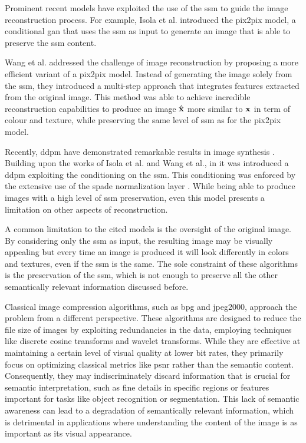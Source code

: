 Prominent recent models have exploited the use of the  \gls{ssm} to guide the image reconstruction process. For example, Isola et al. \cite{isola2017image2image} introduced the pix2pix model, a conditional \gls{gan} that uses the \gls{ssm} as input to generate an image that is able to preserve the \gls{ssm} content.

Wang et al. \cite{Wang2018HighRes} addressed the challenge of image reconstruction by proposing a more efficient variant of a pix2pix model. Instead of generating the image solely from the \gls{ssm}, they introduced a multi-step approach that integrates features extracted from the original image. This method was able to achieve incredible reconstruction capabilities to produce an image $\hat{\mathbf{x}}$ more similar to $\mathbf{x}$ in term of colour and texture, while preserving the same level of \gls{ssm} as for the pix2pix model.

Recently, \gls{ddpm} \cite{Ho2020ddpm} have demonstrated remarkable results in image synthesis \cite{Dhariwal2021DDPM_beat_GAN, Nichol2021Improved_DDPM}. Building upon the works of Isola et al. and Wang et al., in \cite{Wang2022SISDM} it was introduced a \gls{ddpm} exploiting the conditioning on the \gls{ssm}. This conditioning was enforced by the extensive use of the \gls{spade} normalization layer \cite{Park2019SPADE}. While being able to produce images with a high level of \gls{ssm} preservation, even this model presents a limitation on other aspects of reconstruction.

A common limitation to the cited models is the oversight of the original image. By considering only the \gls{ssm} as input, the resulting image may be visually appealing but every time an image is produced it will look differently in colors and textures, even if the \gls{ssm} is the same. The sole constraint of these algorithms is the preservation of the \gls{ssm}, which is not enough to preserve all the other semantically relevant information discussed before.

Classical image compression algorithms, such as \gls{bpg} \cite{Bellard2017BPG} and \gls{jpeg2000}, approach the problem from a different perspective. These algorithms are designed to reduce the file size of images by exploiting redundancies in the data, employing techniques like discrete cosine transforms and wavelet transforms. While they are effective at maintaining a certain level of visual quality at lower bit rates, they primarily focus on optimizing classical metrics like \gls{psnr}  rather than the semantic content. Consequently, they may indiscriminately discard information that is crucial for semantic interpretation, such as fine details in specific regions or features important for tasks like object recognition or segmentation. This lack of semantic awareness can lead to a degradation of semantically relevant information, which is detrimental in applications where understanding the content of the image is as important as its visual appearance.

